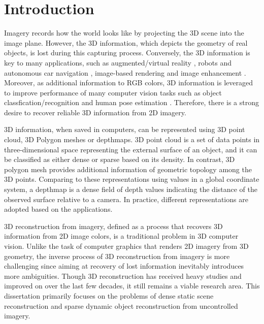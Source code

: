 \chapter{Introduction}

Imagery records how the world looks like by projecting the 3D scene into the image plane. However, the 3D information, which depicts the geometry of real objects, is lost during this capturing process. Conversely, the 3D information is key to many applications, such as augmented/virtual reality \cite{ventura2008depth}, robots and autonomous car navigation \cite{endres2012evaluation}, image-based rendering \cite{View_interpolation1993} and image enhancement  \cite{zhang2014personal}. Moreover, as additional information to RGB colors, 3D information is leveraged to improve performance of many computer vision tasks such as object classfication/recognition \cite{gupta2013perceptual}  and human pose estimation \cite{CVPR_kinect}. Therefore, there is a strong desire to recover reliable 3D information from 2D imagery.

3D information, when saved in computers, can be represented using 3D point cloud, 3D Polygon meshes or depthmaps. 3D point cloud is a set of data points in three-dimensional space representing the external surface of an object, and it can be classified as either dense or sparse based on its density. In contrast, 3D polygon mesh provides additional information of geometric topology among the 3D points. Comparing to these representations using values in a global coordinate system, a depthmap is a dense field of depth values indicating the distance of the observed surface relative to a camera. In practice, different representations are adopted based on the applications. 

3D reconstruction from imagery, defined as a process that recovers 3D information from 2D image colors, is a traditional problem in 3D computer vision. Unlike the task of computer graphics that renders 2D imagery from 3D geometry, the inverse process of 3D reconstruction from imagery is more challenging since aiming at recovery of lost information inevitably introduces more ambiguities. Though 3D reconstruction has received heavy studies and improved on over the last few decades, it still remains a viable research area. This dissertation primarily focuses on the problems of dense static scene reconstruction and sparse dynamic object reconstruction from uncontrolled imagery.

